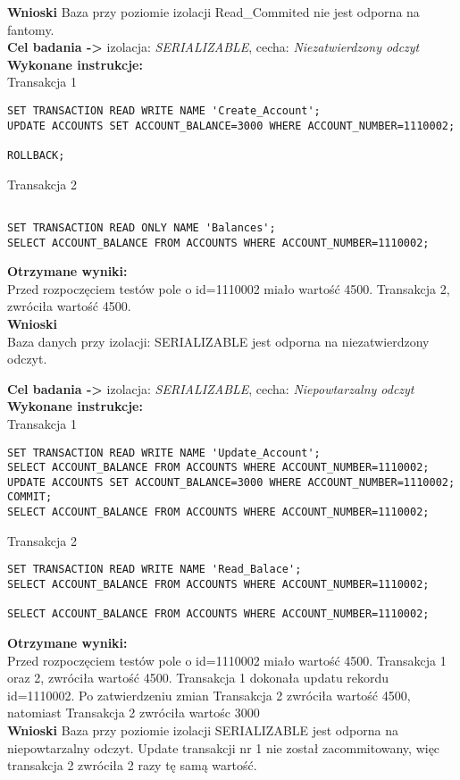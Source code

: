 \documentclass[11pt,oneside, a4paper]{article}
\begin{document}
\textbf{Wnioski } Baza przy poziomie izolacji Read\_Commited nie jest odporna na fantomy.\\
\newpage
\textbf{Cel badania ->} izolacja:
\textit{SERIALIZABLE}, cecha:
\textit{Niezatwierdzony odczyt} \\
\textbf{Wykonane instrukcje: } \\
Transakcja 1
\begin{lstlisting}
SET TRANSACTION READ WRITE NAME 'Create_Account';
UPDATE ACCOUNTS SET ACCOUNT_BALANCE=3000 WHERE ACCOUNT_NUMBER=1110002;

ROLLBACK;
\end{lstlisting}
Transakcja 2
\begin{lstlisting}

SET TRANSACTION READ ONLY NAME 'Balances';
SELECT ACCOUNT_BALANCE FROM ACCOUNTS WHERE ACCOUNT_NUMBER=1110002;
\end{lstlisting}
\textbf{Otrzymane wyniki:} \\
    Przed rozpoczęciem testów pole o id=1110002 miało wartość 4500. Transakcja 2, zwróciła  wartość 4500.\\
\textbf{Wnioski} \\
    Baza danych przy izolacji: SERIALIZABLE jest odporna na niezatwierdzony odczyt. \\
\newpage

\textbf{Cel badania ->} izolacja:
\textit{SERIALIZABLE}, cecha:
\textit{Niepowtarzalny odczyt} \\
\textbf{Wykonane instrukcje: } \\
Transakcja 1
\begin{lstlisting}
SET TRANSACTION READ WRITE NAME 'Update_Account';
SELECT ACCOUNT_BALANCE FROM ACCOUNTS WHERE ACCOUNT_NUMBER=1110002;
UPDATE ACCOUNTS SET ACCOUNT_BALANCE=3000 WHERE ACCOUNT_NUMBER=1110002;
COMMIT;
SELECT ACCOUNT_BALANCE FROM ACCOUNTS WHERE ACCOUNT_NUMBER=1110002;
\end{lstlisting}
Transakcja 2
\begin{lstlisting}
SET TRANSACTION READ WRITE NAME 'Read_Balace';
SELECT ACCOUNT_BALANCE FROM ACCOUNTS WHERE ACCOUNT_NUMBER=1110002;

SELECT ACCOUNT_BALANCE FROM ACCOUNTS WHERE ACCOUNT_NUMBER=1110002;
\end{lstlisting}
\textbf{Otrzymane wyniki:} \\
    Przed rozpoczęciem testów pole o id=1110002 miało wartość 4500. Transakcja 1 oraz 2, zwróciła  wartość 4500. Transakcja 1 dokonała updatu rekordu id=1110002. Po zatwierdzeniu zmian Transakcja 2 zwróciła wartość 4500, natomiast Transakcja 2 zwróciła wartośc 3000\\
\textbf{Wnioski } Baza przy poziomie izolacji SERIALIZABLE jest odporna na niepowtarzalny odczyt. Update transakcji nr 1 nie został zacommitowany, więc transakcja 2 zwróciła 2 razy tę samą wartość.\\
\newpage
\end{document}

